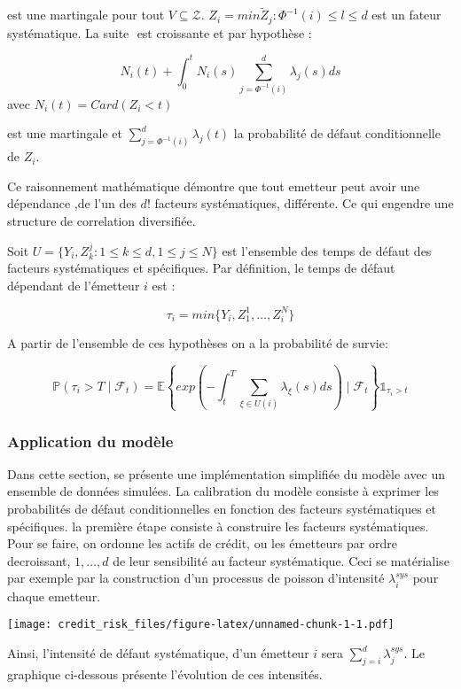 \documentclass[10pt,a4paper]{article}
\begin{document}
	
	est une martingale pour tout $ V \subseteq \mathcal{Z} $. $ Z_i = min{\tilde{Z}_j : \varPhi^{-1}(i)\leq l \leq d } $ est un fateur systématique. La suite $  $ est croissante et par hypothèse : 
	
	
	$$ N_i(t) + \int_0^{t} N_i(s)  \sum_{j=\varPhi^{-1}(i)}^d \lambda_j(s)ds $$ avec $ N_i(t) = Card(Z_i<t)  $
	
	
	est une martingale et $ \sum_{j = \varPhi^{-1}(i)}^{d} \lambda_j(t) $ la probabilité de défaut conditionnelle de $ Z_i $. 
	
	Ce raisonnement mathématique démontre que tout emetteur peut avoir une dépendance ,de l'un des $ d! $ facteurs systématiques, différente. Ce qui engendre une structure de correlation diversifiée. 
	
	
	Soit $ U = \{ Y_i,Z_k^{j}: 1\leq k \leq d, 1\leq j \leq N \}  $ est l'ensemble des temps de défaut des facteurs systématiques et spécifiques. Par définition, le temps de défaut dépendant de l'émetteur $ i $ est :
	
	$$ \tau_i = min\{ Y_i,Z_1^{1},\ldots,Z_i^{N} \} $$ 
	
	A partir de l'ensemble de ces hypothèses on a la probabilité de survie:
	
	$$ \mathbb{P}(\tau_i>T \mid \mathcal{F}_t)  = \mathbb{E} \left\{ exp\left(-\int_t^T \sum_{\xi \in U(i)} \lambda_\xi(s)ds\right) \mid \mathcal{F}_t \right\} \mathds{1}_{\tau_i>t} $$
	
	
	\subsubsection{Application du modèle}
	
	Dans cette section, se présente une implémentation simplifiée du modèle avec un ensemble de données simulées. 
	La calibration du modèle consiste à exprimer les probabilités de défaut conditionnelles en fonction des facteurs systématiques et spécifiques.
	la première étape consiste à construire les facteurs systématiques.
	Pour se faire, on ordonne les actifs de crédit, ou les émetteurs par ordre decroissant, $ 1,\ldots, d $ de leur sensibilité au facteur systématique. Ceci se matérialise par exemple par la construction d'un processus de poisson d'intensité $ \lambda_i^{sys} $ pour chaque emetteur.
	
	\texttt{[image: credit\_risk\_files/figure-latex/unnamed-chunk-1-1.pdf]}
	
	 Ainsi, l'intensité de défaut systématique, d'un émetteur $ i $ sera $ \sum_{j=i}^d  \lambda_j^{sys} $. Le graphique ci-dessous présente l'évolution de ces intensités. 
	
\end{document}
